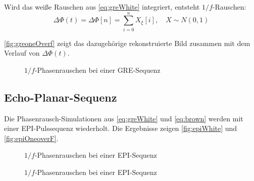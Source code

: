 Wird das weiße Rauschen aus \autoref{eq:greWhite} integriert, entsteht $1/f$-Rauschen:
\begin{equation}
	\label{eq:brown}
	\Delta \Phi(t)=\Delta \Phi[n]= \sum_{i=0}^{n} X_{\xi}[i], \quad X \sim N(0,1)
\end{equation} 

\autoref{fig:greoneOverf} zeigt das dazugehörige rekonstruierte Bild zusammen mit dem Verlauf von $\Delta \Phi(t)$.

\begin{figure}[H]
	\centering
	\hfill
	\label{fig:greoneOverf}
	\caption{$1/f$-Phasenrauschen bei einer GRE-Sequenz}	
\end{figure}

\subsection{Echo-Planar-Sequenz}

Die Phasenrausch-Simulationen aus \autoref{eq:greWhite} und \autoref{eq:brown} werden mit einer EPI-Pulssequenz wiederholt. Die Ergebnisse zeigen \autoref{fig:epiWhite} und \autoref{fig:epiOneoverF}.

\begin{figure}[H]
	\centering
	\hfill
	
	\caption{$1/f$-Phasenrauschen bei einer EPI-Sequenz}
	\label{fig:epiWhite}	
\end{figure}

\begin{figure}[H]
	\centering
	\hfill
	
	\caption{$1/f$-Phasenrauschen bei einer EPI-Sequenz}
	\label{fig:epiOneoverF}	
\end{figure}

